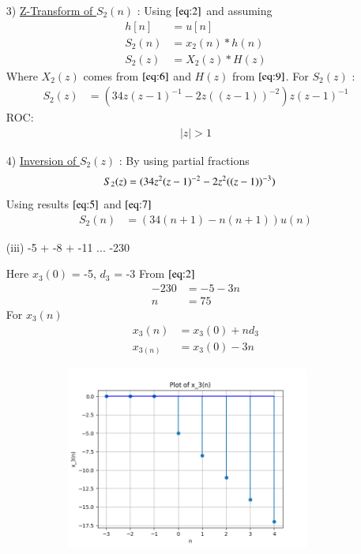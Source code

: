 \documentclass[journal,12pt,twocolumn]{IEEEtran}
\theoremstyle{remark}
\begin{document}
\begin{enumerate}
\item[3)]
\underline{Z-Transform of $S_2(n)$} :
Using $\eqref{eq:2}$ and assuming 
\begin{align}
         h[n] &= u[n] \\
    S_2(n) &= x_2(n) * h(n) \\
    S_2(z) &= X_2(z) * H(z)
    \end{align}
    Where $X_2(z)$ comes from $\eqref{eq:6}$ and $H(z)$ from $\eqref{eq:9}$.
    \vspace{0.05cm}
    For $S_2(z)$ :
    \begin{align}
            S_2(z) &= (34z(z-1)^{-1}-
       2z((z-1))^{-2})z(z-1)^{-1}
    \end{align}
    ROC:
    \begin{align} 
    \lvert z \rvert > 1
    \end{align}
    
    \item[4)]
\underline{Inversion of $S_2(z)$} :
By using partial fractions 
\begin{align}
    S_2(z) &= \notag(34z^2(z-1)^{-2} - 2z^2((z-1))^{-3}) 
\end{align}
Using results $\eqref{eq:5}$ and $\eqref{eq:7}$
\begin{align}
 S_2(n) &= (34(n+1) - n(n+1))u(n)   
\end{align}

\vspace{1cm}
 
\vspace{0.5cm}
\item[(iii)]
-5 + -8 + -11 ... -230\vspace{0.05cm}
\vspace{0.2cm}

Here $x_3(0)$ = -5, $d_3$ = -3\vspace{0.05cm}
From $\eqref{eq:2}$
\begin{align}
-230 &= -5 -3n \\
n &= 75
\end{align}
For $x_3(n)$
\begin{align}
x_3(n) &= x_3(0) + nd_3\\
x_{3(n)} &= x_3(0) - 3n
\end{align}

\begin{figure}[!ht]   
\centering
\graphicspath{ {figs/} }
\includegraphics[width=10cm, height=6cm]{graph_3}
\captionsetup{Graph:3 $x_3(n)$ vs n }
\label{graph:4}
\end{figure}


\end{enumerate}
\end{document}
